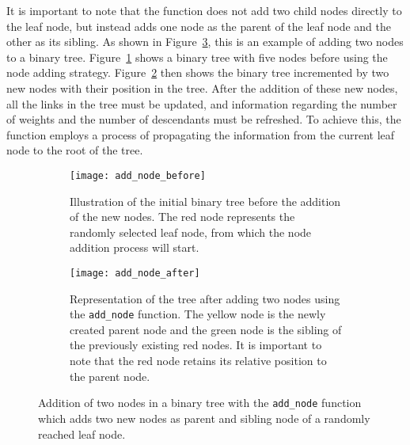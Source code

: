 It is important to note that the function does not add two child nodes directly to the leaf node, but instead adds one node as the parent of the leaf node and the other as its sibling. As shown in Figure~\ref{fig:add_node}, this is an example of adding two nodes to a binary tree. Figure~\ref{fig:add_node_before} shows a binary tree with five nodes before using the node adding strategy. Figure~\ref{fig:add_node_after} then shows the binary tree incremented by two new nodes with their position in the tree. After the addition of these new nodes, all the links in the tree must be updated, and information regarding the number of weights and the number of descendants must be refreshed. To achieve this, the function employs a process of propagating the information from the current leaf node to the root of the tree. 

\begin{figure}[!ht]
    \centering
\begin{subfigure}{.48\textwidth}
    \centering
    \texttt{[image: add\_node\_before]}
    \caption{Illustration of the initial binary tree before the addition of the new nodes. The red node represents the randomly selected leaf node, from which the node addition process will start.} 
    \label{fig:add_node_before}
\end{subfigure}%
\hspace{1em}
\begin{subfigure}{.48\textwidth}
    \centering
    \texttt{[image: add\_node\_after]} 
    \caption{Representation of the tree after adding two nodes using the \texttt{add\_node} function. The yellow node is the newly created parent node and the green node is the sibling of the previously existing red nodes. It is important to note that the red node retains its relative position to the parent node.} 
    \label{fig:add_node_after}
\end{subfigure}
\caption{Addition of two nodes in a binary tree with the \texttt{add\_node} function which adds two new nodes as parent and sibling node of a randomly reached leaf node.}
\label{fig:add_node}
\end{figure}



